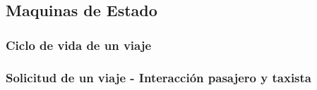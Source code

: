 \subsection{Maquinas de Estado}

\subsubsection{Ciclo de vida de un viaje}
\label{section:ciclovidaviaje}
\subsubsection{Solicitud de un viaje - Interacci\'on pasajero y taxista}

